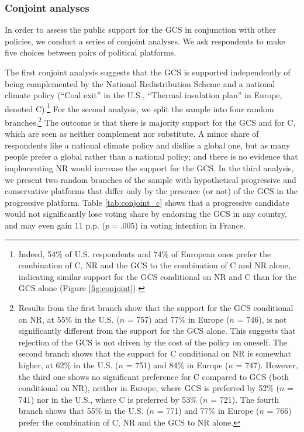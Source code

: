 \subsubsection{Conjoint analyses}\label{subsubsec:conjoint} %

In order to assess the public support for the GCS in conjunction with other policies, we conduct a series of conjoint analyses. We ask respondents to make five choices between pairs of political platforms.

The first conjoint analysis suggests that the GCS is supported independently of being complemented by the National Redistribution Scheme and a national climate policy (``Coal exit'' in the U.S., ``Thermal insulation plan'' in Europe, denoted C).\footnote{Indeed, 54\% of %
U.S. respondents and 74\% of %
European ones prefer the combination of C, NR and the GCS to the combination of C and NR alone, indicating similar support for the GCS conditional on NR and C than for the GCS alone (Figure \ref{fig:conjoint}).} %
For the second analysis, we split the sample into four random branches.\footnote{Results from the first branch show that the support for the GCS conditional on NR, at 55\% in the U.S. ($n$ = 757) and 77\% in Europe ($n$ = 746), is not significantly different from the support for the GCS alone. This suggests that rejection of the GCS is not driven by the cost of the policy on oneself. The second branch shows that the support for C conditional on NR is somewhat higher, at 62\% in the U.S. ($n$ = 751) and 84\% in Europe ($n$ = 747). However, the third one shows no significant preference for C compared to GCS (both conditional on NR), neither in Europe, where GCS is preferred by 52\% ($n$ = 741) nor in the U.S., where C is preferred by 53\% ($n$ = 721). The fourth branch shows that 55\% in the U.S. ($n$ = 771) and 77\% in Europe ($n$ = 766) prefer the combination of C, NR and the GCS to NR alone.} The outcome is that there is majority support for the GCS and for C, which are seen as neither complement nor substitute. A minor share of respondents like a national climate policy and dislike a global one, but as many people prefer a global rather than a national policy; and there is no evidence that implementing NR would increase the support for the GCS.
In the third analysis, we present two random branches of the sample with hypothetical progressive and conservative platforms that differ only by the presence (or not) of the GCS in the progressive platform. Table \ref{tab:conjoint_c} shows that a progressive candidate would not significantly lose voting share by endorsing the GCS in any country, and may even gain 11 p.p. ($p = .005$) in voting intention in France. %
